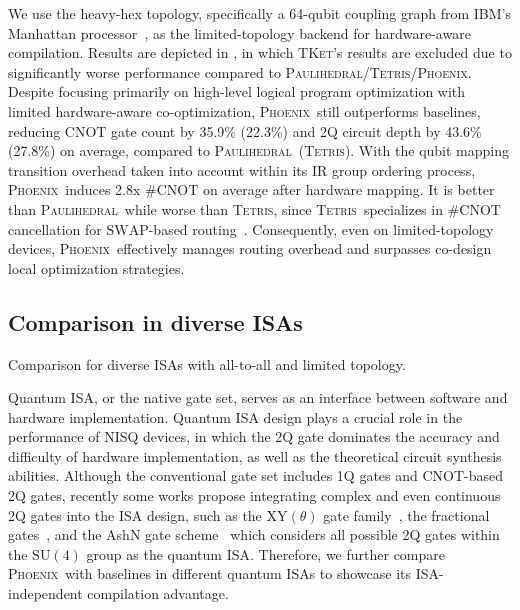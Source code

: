 \documentclass[conference,9pt]{IEEEtran}
\newcommand{\phoenix}{\textsc{Phoenix}}
\newcommand{\tket}{\textsc{TKet}}
\newcommand{\tetris}{\textsc{Tetris}}
\newcommand{\paulihedral}{\textsc{Paulihedral}}
\newcommand{\SWAP}{\mathrm{SWAP}}
\newcommand{\CNOT}{\mathrm{CNOT}}
\newcommand{\SUfour}{\mathrm{SU}(4)}
\begin{document}
    We use the heavy-hex topology, specifically a 64-qubit coupling graph from IBM's Manhattan processor~\cite{mooney2021whole}, as the limited-topology backend for hardware-aware compilation. Results are depicted in , in which \tket's results are excluded due to significantly worse performance compared to \paulihedral/\tetris/\phoenix. Despite focusing primarily on high-level logical program optimization with limited hardware-aware co-optimization, \phoenix\ still outperforms baselines, reducing $\CNOT$ gate count by 35.9\% (22.3\%) and 2Q circuit depth by 43.6\% (27.8\%) on average, compared to \paulihedral\ (\tetris). With the qubit mapping transition overhead taken into account within its IR group ordering process, \phoenix\ induces 2.8x \#$ \CNOT $ on average after hardware mapping. It is better than \paulihedral\ while worse than \tetris, since \tetris\ specializes in \#$\CNOT$ cancellation for $ \SWAP $-based routing~\cite{jin2024tetris}. Consequently, even on limited-topology devices, \phoenix\ effectively manages routing overhead and surpasses co-design local optimization strategies.


\subsection{Comparison in diverse ISAs}


    \begin{table}[tbp]
        \centering
        \caption{Comparison for diverse ISAs with all-to-all and limited topology.}
        
        \label{tab:isa}
    \end{table}

    Quantum ISA, or the native gate set, serves as an interface between software and hardware implementation. Quantum ISA design plays a crucial role in the performance of NISQ devices, in which the 2Q gate dominates the accuracy and difficulty of hardware implementation, as well as the theoretical circuit synthesis abilities. Although the conventional gate set includes 1Q gates and CNOT-based 2Q gates, recently some works propose integrating complex and even continuous 2Q gates into the ISA design, such as the $\mathrm{XY}(\theta)$ gate family~\cite{abrams2020implementation}, the fractional gates~\cite{ibm_fractional_gates}, and the AshN gate scheme~\cite{chen2024one} which considers all possible 2Q gates within the $\SUfour$ group as the quantum ISA.    
    Therefore, we further compare \phoenix\ with baselines in different quantum ISAs to showcase its ISA-independent compilation advantage.
    
\end{document}
